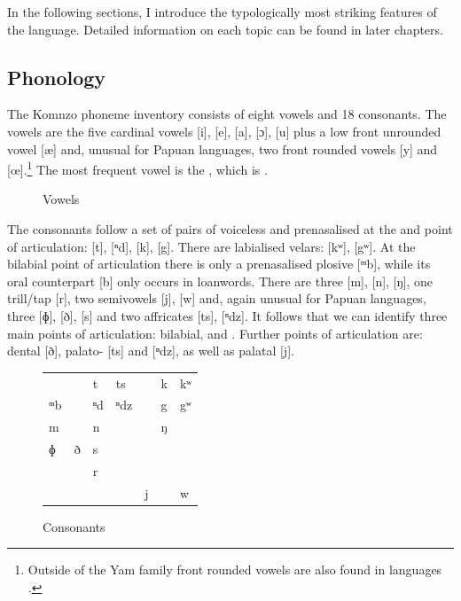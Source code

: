 In the following sections, I introduce the typologically most striking features of the language. Detailed information on each topic can be found in later chapters.

\subsection{Phonology}

The Komnzo phoneme inventory consists of eight vowels and 18 consonants. The vowels are the five cardinal vowels [i], [e], [a], [ɔ], [u] plus a low front unrounded vowel [æ] and, unusual for Papuan languages, two front rounded vowels [y] and [œ].\footnote{Outside of the Yam family front rounded vowels are also found in  languages \citep[60]{vanEnk:1997tl}.} The most frequent vowel is the , which is .

\begin{figure}
	{
		\begin{vowel}[plain]
		\end{vowel}
	}%
	\caption{Vowels}
	\label{vowels}
\end{figure}

The consonants follow a set of pairs of voiceless and prenasalised  at the  and  point of articulation: [t], [ⁿd], [k], [{\ᵑ}g]. There are labialised velars: [kʷ], [{\ᵑ}gʷ]. At the bilabial point of articulation there is only a prenasalised plosive [ᵐb], while its oral counterpart [b] only occurs in loanwords. There are three  [m], [n], [ŋ], one trill/tap [r], two semivowels [j], [w] and, again unusual for Papuan languages, three  [ɸ], [ð], [s] and two affricates [ts], [ⁿdz]. It follows that we can identify three main points of articulation: bilabial,  and . Further points of articulation are: dental [ð], palato- [ts] and [ⁿdz], as well as palatal [j].

\begin{figure}
\caption{Consonants}
\label{consonants}
	\begin{tabularx}{\textwidth}{XXXXXXX}
		&&t&ts&&k&kʷ\\
		ᵐb&&ⁿd&ⁿdz&&{\ᵑ}g&{\ᵑ}gʷ\\
		m&&n&&&ŋ&\\
		ɸ&ð&s&&&&\\
		&&r&&&&\\
		&&&&j&&w\\
	\end{tabularx}
\end{figure}

